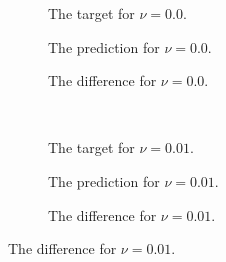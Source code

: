 \documentclass[preprint,12pt,times,authoryear]{elsarticle}
\begin{document}
\begin{figure}[hbp]
  \centering
  \begin{adjustwidth}{-0.1\linewidth}{-0.1\linewidth}
    \begin{subfigure}{0.33\linewidth}
      \begin{adjustbox}{width=\linewidth}
        
      \end{adjustbox}
      \caption{The target for \(\nu=0.0\).}\label{fig:sc2_rollout_target_0.0}
    \end{subfigure}
    \begin{subfigure}{0.33\linewidth}
      \begin{adjustbox}{width=\linewidth}
        
      \end{adjustbox}
      \caption{The prediction for \(\nu=0.0\).}\label{fig:sc2_rollout_pred_0.0}
    \end{subfigure}
    \begin{subfigure}{0.32\linewidth}
      \begin{adjustbox}{width=\linewidth}
        
      \end{adjustbox}
      \caption{The difference for \(\nu=0.0\).}\label{fig:sc2_rollout_diff_0.0}
    \end{subfigure}
    \\[0.7\baselineskip]
    \begin{subfigure}{0.33\linewidth}
      \begin{adjustbox}{width=\linewidth}
        
      \end{adjustbox}
      \caption{The target for \(\nu=0.01\).}\label{fig:sc2_rollout_target_0.01}
    \end{subfigure}
    \begin{subfigure}{0.33\linewidth}
      \begin{adjustbox}{width=\linewidth}
        
      \end{adjustbox}
      \caption{The prediction for \(\nu=0.01\).}\label{fig:sc2_rollout_pred_0.01}
    \end{subfigure}
    \begin{subfigure}{0.32\linewidth}
      \begin{adjustbox}{width=\linewidth}
        
      \end{adjustbox}
      \caption{The difference for \(\nu=0.01\).}\label{fig:sc2_rollout_diff_0.01}

\end{subfigure}
\end{adjustwidth}
\end{figure}
\end{document}
